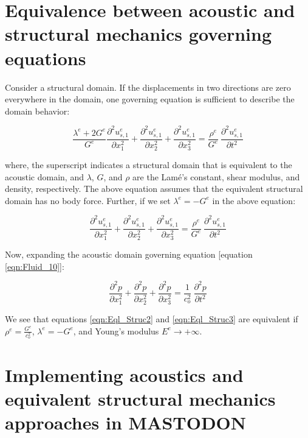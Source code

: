 \documentclass[3p]{elsarticle}
\begin{document}
\section{Equivalence between acoustic and structural mechanics governing equations}

\noindent Consider a structural domain. If the displacements in two directions are zero everywhere in the domain, one governing equation is sufficient to describe the domain behavior:

\begin{equation}
    \label{eqn:Eql_Struc1}
    \frac{\lambda^e + 2 G^e}{G^e}\frac{\partial^2u_{s,1}^e}{\partial x_1^2}+\frac{\partial^2u_{s,1}^e}{\partial x_2^2}+\frac{\partial^2u_{s,1}^e}{\partial x_3^2} = \frac{\rho^e}{G^e}~\frac{\partial^2u_{s,1}^e}{\partial t^2}
\end{equation}

\noindent where, the superscript indicates a structural domain that is equivalent to the acoustic domain, and $\lambda$, $G$, and $\rho$ are the Lam\'e's constant, shear modulus, and density, respectively. The above equation assumes that the equivalent structural domain has no body force. Further, if we set $\lambda^e = -G^e$ in the above equation:

\begin{equation}
    \label{eqn:Eql_Struc2}
    \frac{\partial^2u_{s,1}^e}{\partial x_1^2}+\frac{\partial^2u_{s,1}^e}{\partial x_2^2}+\frac{\partial^2u_{s,1}^e}{\partial x_3^2} = \frac{\rho^e}{G^e}~\frac{\partial^2u_{s,1}^e}{\partial t^2}
\end{equation}

\noindent Now, expanding the acoustic domain governing equation [equation \eqref{eqn:Fluid_10}]:

\begin{equation}
    \label{eqn:Eql_Struc3}
    \frac{\partial^2 p}{\partial x_1^2}+\frac{\partial^2 p}{\partial x_2^2}+\frac{\partial^2 p}{\partial x_3^2} = \frac{1}{c_o^2}~\frac{\partial^2 p}{\partial t^2}
\end{equation}

\noindent We see that equations \eqref{eqn:Eql_Struc2} and \eqref{eqn:Eql_Struc3} are equivalent if $\rho^e = \frac{G^e}{c_o^2}$, $\lambda^e = -G^e$, and Young's modulus $E^e \to +\infty$.

\section{Implementing acoustics and equivalent structural mechanics approaches in MASTODON}
\end{document}

